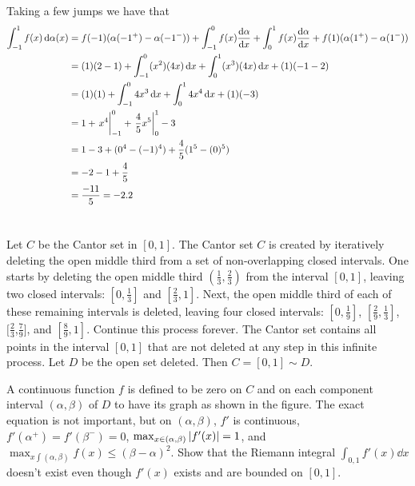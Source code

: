 \documentclass[]{article}
\begin{document}
Taking a few jumps we have that \begin{align*}
    \int_{-1}^{1} f(x) \dd{\alpha(x)}
        &= f(-1) (\alpha(-1^+) - \alpha(-1^-))
            + \int_{-1}^{0} f(x) \dv{\alpha}{x}
            + \int_{0}^{1} f(x) \dv{\alpha}{x}
            + f(1) (\alpha(1^+) - \alpha(1^-))\\
        &= (1) (2 - 1)
            + \int_{-1}^{0} (x^2) (4 x) \dd{x}
            + \int_{0}^{1} (x^3) (4 x) \dd{x}
            + (1) (-1 - 2)\\
        &= (1) (1)
            + \int_{-1}^{0} 4 x^3 \dd{x}
            + \int_{0}^{1} 4 x^4 \dd{x}
            + (1) (-3)\\
        &= 1
            + \eval{x^4}_{-1}^{0}
            + \eval{\frac{4}{5} x^5}_{0}^{1}
            -3\\
        &= 1 - 3 
            + (0^4 - (-1)^4)
            + \frac{4}{5} (1^5 - (0)^5)\\
        &= -2 - 1 + \frac{4}{5}\\
        &= \frac{-11}{5} = -2.2
\end{align*}

\newpage
\section{}
Let $C$ be the Cantor set in $[0, 1]$. 
The Cantor set $C$ is created by iteratively deleting the open middle third from a set of non-overlapping closed intervals. 
One starts by deleting the open middle third $(\frac{1}{3}, \frac{2}{3})$ from the interval $[0,1]$, leaving two closed intervals: $[0, \frac{1}{3}]$ and $[\frac{2}{3},1]$. 
Next, the open middle third of each of these remaining intervals is deleted, leaving four closed intervals: $[0,\frac{1}{9}]$, $[\frac{2}{9},\frac{1}{3}]$, $[\frac{2}{3}$,$\frac{7}{9}]$, and $[\frac{8}{9},1]$.
Continue this process forever.
The Cantor set contains all points in the interval $[0, 1]$ that are not deleted at any step in this infinite process. 
Let $D$ be the open set deleted. 
Then $C = [0,1] \sim D$.

A continuous function $f$ is defined to be zero on $C$ and on each component interval $(\alpha, \beta)$ of $D$ to have its graph as shown in the figure. 
The exact equation is not important, but on $(\alpha,\beta)$, $f'$ is continuous, $f'(\alpha^+) = f'(\beta^-) = 0$, $\max_{x\in(\alpha,\beta)} \abs{f'(x)} = 1$, and $\max_{x\int(\alpha,\beta)} f(x) \leq (\beta-\alpha)^2$. 
Show that the Riemann integral $\int_{0,1} f'(x) \dd{x}$ doesn't exist even though $f'(x)$ exists and are bounded on $[0,1]$.
\end{document}
